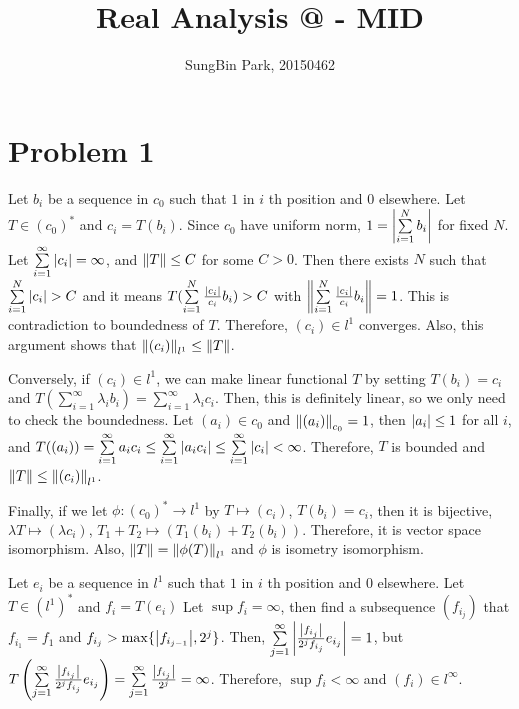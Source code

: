 \documentclass{article}
\makeatletter
\newcommand*{\rom}[1]{\expandafter\@slowromancap\romannumeral #1@}
\makeatother
\begin{document}
\title{Real Analysis \rom{2} - MID}
\author{SungBin Park, 20150462} 

\maketitle

\section*{Problem 1}
Let $b_i$ be a sequence in $c_0$ such that $1$ in $i$ th position and 0 elsewhere. Let $T\in (c_0)^*$ and $c_i=T(b_i)$. Since $c_0$ have uniform norm, $1=\abs{\sum\limits_{i=1}^N b_i}$ for fixed $N$. Let $\sum\limits_{i=1}^\infty \abs{c_i}=\infty$, and $\norm{T}\leq C$ for some $C>0$. Then there exists $N$ such that $\sum\limits_{i=1}^N \abs{c_i}>C$ and it means $T(\sum\limits_{i=1}^N \frac{\abs{c_i}}{c_i}b_i)>C$ with $\norm{\sum\limits_{i=1}^N \frac{\abs{c_i}}{c_i}b_i}=1$. This is contradiction to boundedness of $T$. Therefore, $(c_i)\in l^1$ converges. Also, this argument shows that $\norm{(c_i)}_{l^1}\leq \norm{T}$. 

Conversely, if $(c_i)\in l^1$, we can make linear functional $T$ by setting $T(b_i)=c_i$ and $T(\sum\limits_{i=1}^\infty \lambda_i b_i)=\sum\limits_{i=1}^\infty \lambda_i c_i$. Then, this is definitely linear, so we only need to check the boundedness. Let $(a_i)\in c_0$ and $\norm{(a_i)}_{c_0}=1$, then $\abs{a_i}\leq 1$ for all $i$, and $T((a_i))=\sum\limits_{i=1}^\infty a_i c_i\leq \sum\limits_{i=1}^\infty \abs{a_ic_i}\leq \sum\limits_{i=1}^\infty \abs{c_i}<\infty$. Therefore, $T$ is bounded and $\norm{T}\leq \norm{(c_i)}_{l^1}$.

Finally, if we let $\phi:(c_0)^*\rightarrow l^1$ by $T\mapsto (c_i)$, $T(b_i)=c_i$, then it is bijective, $\lambda T\mapsto (\lambda c_i)$, $T_1+T_2\mapsto (T_1(b_i)+T_2(b_i))$. Therefore, it is vector space isomorphism. Also, $\norm{T}=\norm{\phi(T)}_{l^1}$ and $\phi$ is isometry isomorphism.

Let $e_i$ be a sequence in $l^1$ such that $1$ in $i$ th position and 0 elsewhere. Let $T\in (l^1)^*$ and $f_i=T(e_i)$ Let $\sup f_i=\infty$, then find a subsequence $(f_{i_j})$ that $f_{i_1}=f_1$ and $f_{i_j}>\max\{\abs{f_{i_{j-1}}}, 2^j\}$. Then, $\sum\limits_{j=1}^\infty \abs{\frac{\abs{f_{i_j}}}{2^jf_{i_j}}e_{i_j}}=1$, but $T\left(\sum\limits_{j=1}^\infty \frac{\abs{f_{i_j}}}{2^j f_{i_j}}e_{i_j}\right)=\sum\limits_{j=1}^\infty \frac{\abs{f_{i_j}}}{2^j}=\infty$. Therefore, $\sup f_i<\infty$ and $(f_i)\in l^\infty$.
\end{document}
